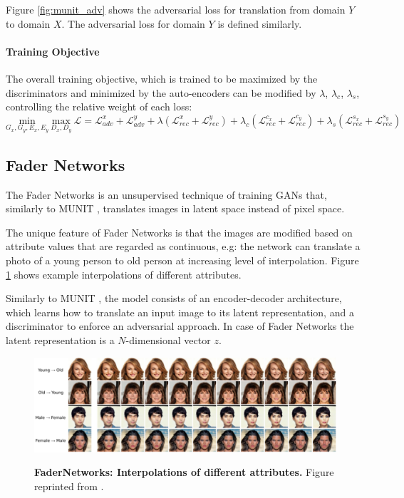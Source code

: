 \documentclass[12pt]{report}
\begin{document}
Figure \ref{fig:munit_adv} shows the adversarial loss for translation from domain $Y$ to domain $X$. The adversarial loss for domain $Y$ is defined similarly.


\paragraph{Training Objective}
The overall training objective, which is trained to be maximized by the discriminators and minimized by the auto-encoders can be modified by $\lambda$, $\lambda_c$, $\lambda_s$, controlling the relative weight of each loss:
\begin{equation}
\underset{G_x, G_y, E_x, E_y}{\mathrm{min}} \ \underset{D_x, D_y}{\mathrm{max}} \ \mathcal{L} = \mathcal{L}^{x}_{adv} + \mathcal{L}^{y}_{adv} + 
\lambda(\mathcal{L}^{x}_{rec} + \mathcal{L}^{y}_{rec}) + 
\lambda_c(\mathcal{L}^{c_x}_{rec} + \mathcal{L}^{c_y}_{rec}) + 
\lambda_s(\mathcal{L}^{s_x}_{rec} + \mathcal{L}^{s_y}_{rec})
\end{equation}


\pagebreak
\subsection{Fader Networks}
The Fader Networks \cite{lample_fader_2017} is an unsupervised technique of training GANs that, similarly to MUNIT \cite{huang_multimodal_2018}, translates images in latent space instead of pixel space. 

The unique feature of Fader Networks is that the images are modified based on attribute values that are regarded as continuous, e.g: the network can translate a photo of a young person to old person at increasing level of interpolation. Figure \ref{fig:fader_ex} shows example interpolations of different attributes.

Similarly to MUNIT \cite{huang_multimodal_2018}, the model consists of an encoder-decoder architecture, which learns how to translate an input image to its latent representation, and a discriminator to enforce an adversarial approach. In case of Fader Networks the latent representation is a $N$-dimensional vector $z$.

\begin{figure}[h]
\centering
{\includegraphics[width=\linewidth]{03_analysis/gans/fader_example}}
\caption{\label{fig:fader_ex} \textbf{FaderNetworks: Interpolations of different attributes.} Figure reprinted from \cite{lample_fader_2017}.}
\end{figure}
\end{document}
